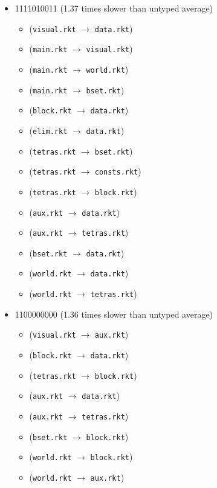 \documentclass{article}
\newcommand{\mono}[1]{\texttt{#1}}
\begin{document}
\begin{itemize}
\item 1111010011 (1.37 times slower than untyped average)
  \begin{itemize}
  \item (\mono{visual.rkt} $\rightarrow$ \mono{data.rkt})
  \item (\mono{main.rkt} $\rightarrow$ \mono{visual.rkt})
  \item (\mono{main.rkt} $\rightarrow$ \mono{world.rkt})
  \item (\mono{main.rkt} $\rightarrow$ \mono{bset.rkt})
  \item (\mono{block.rkt} $\rightarrow$ \mono{data.rkt})
  \item (\mono{elim.rkt} $\rightarrow$ \mono{data.rkt})
  \item (\mono{tetras.rkt} $\rightarrow$ \mono{bset.rkt})
  \item (\mono{tetras.rkt} $\rightarrow$ \mono{consts.rkt})
  \item (\mono{tetras.rkt} $\rightarrow$ \mono{block.rkt})
  \item (\mono{aux.rkt} $\rightarrow$ \mono{data.rkt})
  \item (\mono{aux.rkt} $\rightarrow$ \mono{tetras.rkt})
  \item (\mono{bset.rkt} $\rightarrow$ \mono{data.rkt})
  \item (\mono{world.rkt} $\rightarrow$ \mono{data.rkt})
  \item (\mono{world.rkt} $\rightarrow$ \mono{tetras.rkt})
  \end{itemize}
\item 1100000000 (1.36 times slower than untyped average)
  \begin{itemize}
  \item (\mono{visual.rkt} $\rightarrow$ \mono{aux.rkt})
  \item (\mono{block.rkt} $\rightarrow$ \mono{data.rkt})
  \item (\mono{tetras.rkt} $\rightarrow$ \mono{block.rkt})
  \item (\mono{aux.rkt} $\rightarrow$ \mono{data.rkt})
  \item (\mono{aux.rkt} $\rightarrow$ \mono{tetras.rkt})
  \item (\mono{bset.rkt} $\rightarrow$ \mono{block.rkt})
  \item (\mono{world.rkt} $\rightarrow$ \mono{block.rkt})
  \item (\mono{world.rkt} $\rightarrow$ \mono{aux.rkt})
  \end{itemize}


\end{itemize}
\end{document}
